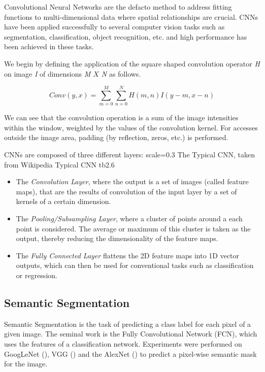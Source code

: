 Convolutional Neural Networks are the defacto method to address fitting functions to multi-dimensional data where spatial relationships are crucial. CNNs have been applied successfully to several computer vision tasks such as segmentation, classification, object recognition, etc. and high performance has been achieved in these tasks.

We begin by defining the application of the square shaped convolution operator \emph{H} on image \emph{I} of dimensions \emph{M $X$ N} as follows.

\[Conv(y, x) = \sum_{m=0}^{M}\sum_{n=0}^{N}H(m, n)I(y-m, x-n)\]

We can see that the convolution operation is a sum of the image intensities within the window, weighted by the values of the convolution kernel. For accesses outside the image area, padding (by reflection, zeros, etc.) is performed.

CNNs are composed of three different layers: 
{scale=0.3}%
{The Typical CNN, taken from Wikipedia}%
{Typical CNN}%
{tb2.6} %

\begin{itemize}
	\item The \textit{Convolution Layer}, where the output is a set of images (called feature maps), that are the results of convolution of the input layer by a set of kernels of a certain dimension. \\
	\item The \textit{Pooling/Subsampling Layer}, where a cluster of points around a each point is considered. The average or maximum of this cluster is taken as the output, thereby reducing the dimensionality of the feature maps. \\ 
	\item The \textit{Fully Connected Layer} flattens the 2D feature maps into 1D vector outputs, which can then be used for conventional tasks such as classification or regression. 
\end{itemize}

\subsection{Semantic Segmentation}
Semantic Segmentation is the task of predicting a class label for each pixel of a given image. The seminal work is the Fully Convolutional Network (FCN), which uses the features of a classification network. Experiments were performed on GoogLeNet (\cite{Szegedy2015}), VGG (\cite{Simonyan2015}) and the AlexNet (\cite{Krizhevsky2012}) to predict a pixel-wise semantic mask for the image. 

